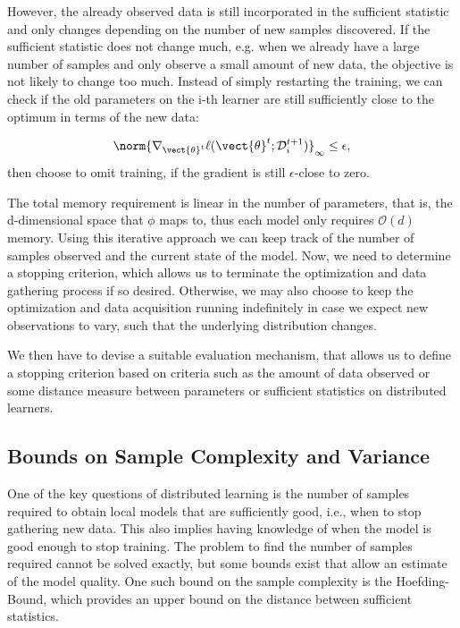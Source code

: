 However, the already observed data is still incorporated in the sufficient statistic and only changes depending on the number of new samples discovered.
If the sufficient statistic does not change much, e.g. when we already have a large number of samples and only observe a small amount of new data, the objective is not likely to change too much. 
Instead of simply restarting the training, we can check if the old parameters on the i-th learner are still sufficiently close to the optimum in terms of the new data: 

\begin{equation}
    \norm{\nabla_{\vect{\theta}^t} \ell(\vect{\theta}^{t} ; \mathcal{D}_i^{t+1})}_{\infty} \leq \epsilon,
\end{equation}
then choose to omit training, if the gradient is still $\epsilon$-close to zero.

The total memory requirement is linear in the number of parameters, that is, the d-dimensional space that $\phi$ maps to, thus each model only requires $\mathcal{O}(d)$ memory.
Using this iterative approach we can keep track of the number of samples observed and the current state of the model.
Now, we need to determine a stopping criterion, which allows us to terminate the optimization and data gathering process if so desired. 
Otherwise, we may also choose to keep the optimization and data acquisition running indefinitely in case we expect new observations to vary, such that the underlying distribution changes.

We then have to devise a suitable evaluation mechanism, that allows us to define a stopping criterion based on criteria such as the amount of data observed or some distance measure between parameters or sufficient statistics on distributed learners.

\subsection{Bounds on Sample Complexity and Variance}
\label{ssec:bounds}
One of the key questions of distributed learning is the number of samples required to obtain local models that are sufficiently good, i.e., when to stop gathering new data.
This also implies having knowledge of when the model is good enough to stop training.
The problem to find the number of samples required cannot be solved exactly, but some bounds exist that allow an estimate of the model quality.
One such bound on the sample complexity is the Hoefding-Bound, which provides an upper bound on the distance between sufficient statistics.
 

